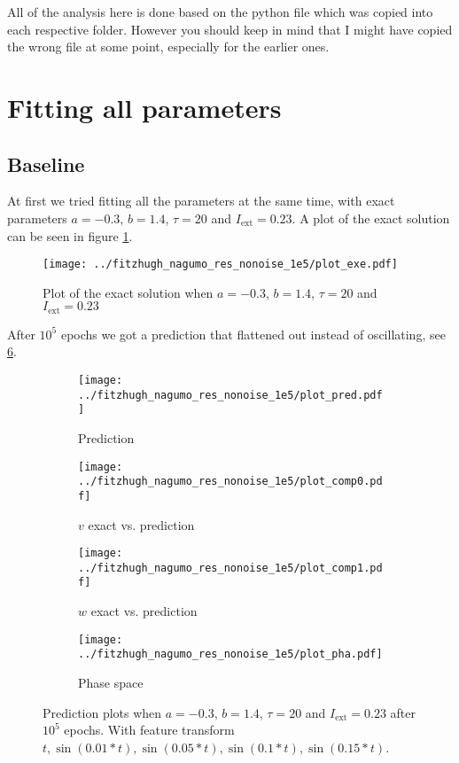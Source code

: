 \documentclass[a4paper]{article}
\begin{document}
	

All of the analysis here is done based on the python file which was copied into each respective folder. However you should keep in mind that I might have copied the wrong file at some point, especially for the earlier ones. 

\section{Fitting all parameters}

\subsection{Baseline}

At first we tried fitting all the parameters at the same time, with exact parameters $a=-0.3$, $b=1.4$, $\tau=20$ and $ I_{\text{ext}}=0.23$. A plot of the exact solution can be seen in figure \ref{plot:exe}.

\begin{figure}[H]
	\centering 
	\texttt{[image: ../fitzhugh\_nagumo\_res\_nonoise\_1e5/plot\_exe.pdf]}
	\caption{Plot of the exact solution when $a=-0.3$, $b=1.4$, $\tau=20$ and $ I_{\text{ext}}=0.23$}
	\label{plot:exe}
\end{figure}


After $10^5$ epochs we got a prediction that flattened out instead of oscillating, see \ref{plot:all00}. 

\begin{figure}[H]
	\centering 
	\begin{subfigure}[b]{0.47\textwidth}
		\centering
		\texttt{[image: ../fitzhugh\_nagumo\_res\_nonoise\_1e5/plot\_pred.pdf]}
		\caption{Prediction}
		\label{fig:all00a}
	\end{subfigure}
	\begin{subfigure}[b]{0.47\textwidth}
		\centering
		\texttt{[image: ../fitzhugh\_nagumo\_res\_nonoise\_1e5/plot\_comp0.pdf]}
		\caption{$v$ exact vs. prediction}
		\label{fig:all00b}
	\end{subfigure}
	\begin{subfigure}[b]{0.47\textwidth}
		\centering
		\texttt{[image: ../fitzhugh\_nagumo\_res\_nonoise\_1e5/plot\_comp1.pdf]}
		\caption{$w$ exact vs. prediction}
		\label{fig:all00c}
	\end{subfigure}
	\begin{subfigure}[b]{0.47\textwidth}
		\centering
		\texttt{[image: ../fitzhugh\_nagumo\_res\_nonoise\_1e5/plot\_pha.pdf]}
		\caption{Phase space}
		\label{fig:all00d}
	\end{subfigure}
	\caption{Prediction plots when $a=-0.3$, $b=1.4$, $\tau=20$ and $ I_{\text{ext}}=0.23$ after $10^5$ epochs. With feature transform $t, \sin(0.01 * t), \sin(0.05 * t), \sin(0.1 * t), \sin(0.15 * t)$.}
	\label{plot:all00}
\end{figure}
\end{document}
